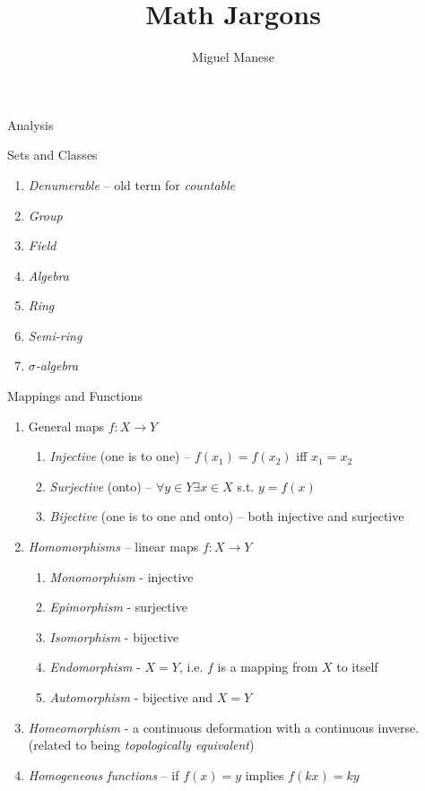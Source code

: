 \documentclass{article}
\title{Math Jargons}
\author{Miguel Manese}
\begin{document}
\maketitle

\begin{section}{Analysis}
\begin{subsection}{Sets and Classes}
\begin{enumerate}
\item \emph{Denumerable} -- old term for \emph{countable}
\item \emph{Group}
\item \emph{Field}
\item \emph{Algebra}
\item \emph{Ring}
\item \emph{Semi-ring}
\item \emph{$\sigma$-algebra}
\end{enumerate}

\end{subsection}

\begin{subsection}{Mappings and Functions}
\begin{enumerate}
\item General maps $f : X \to Y$
  \begin{enumerate}
  \item \emph{Injective} (one is to one) -- $f(x_1) = f(x_2)$ iff $x_1 = x_2$
  \item \emph{Surjective} (onto) -- $\forall y \in Y \exists x \in X$ s.t. 
        $y = f(x)$
  \item \emph{Bijective} (one is to one and onto) -- both injective and 
        surjective
  \end{enumerate}
\item \emph{Homomorphisms} -- linear maps $f : X \to Y$
  \begin{enumerate}
  \item \emph{Monomorphism} - injective
  \item \emph{Epimorphism} - surjective
  \item \emph{Isomorphism} - bijective
  \item \emph{Endomorphism} - $X = Y$, i.e. $f$ is a mapping from $X$ to itself
  \item \emph{Automorphism} - bijective and $X = Y$
  \end{enumerate}
\item \emph{Homeomorphism} - a continuous deformation with a continuous 
      inverse. (related to being \emph{topologically equivalent})
\item \emph{Homogeneous functions} -- if $f(x) = y$ implies $f(kx) = ky$
\end{enumerate}
\end{subsection}

\end{section}
\end{document}
